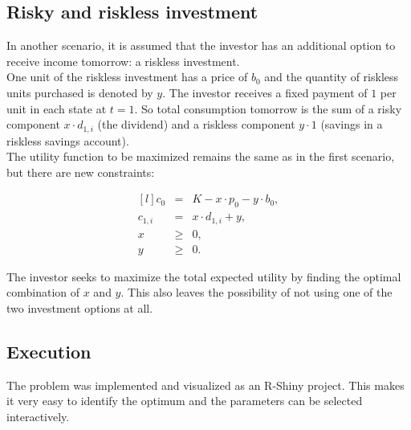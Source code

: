 \bigskip

\subsection{Risky and riskless investment}

\noindent In another scenario, it is assumed that the investor has an additional option to receive income tomorrow: a riskless investment. \\
One unit of the riskless investment has a price of $b_0$ and the quantity of riskless units purchased is denoted by $y$. The investor receives a fixed payment of $1$ per unit in each state at $t=1$. So total consumption tomorrow  is the sum of a risky component $x \cdot d_{1,i}$ (the dividend) and a riskless component $y \cdot 1$ (savings in a riskless savings account). \\

\noindent The utility function to be maximized remains the same as in the first scenario, but there are new constraints:

\begin{equation}\label{eq:scenario2_constraints}
    \begin{matrix*}[l]
        c_0 & = & K - x \cdot p_0 - y \cdot b_0, \\
        c_{1,i} & = & x \cdot d_{1,i} + y,\\
        x & \geq & 0,\\
        y & \geq & 0.
    \end{matrix*}
\end{equation}

\bigskip

\noindent The investor seeks to maximize the total expected utility by finding the optimal combination of $x$ and $y$. This also leaves the possibility of not using one of the two investment options at all.

\bigskip

\subsection{Execution}

\noindent The problem was implemented and visualized as an R-Shiny project. This makes it very easy to identify the optimum and the parameters can be selected interactively.
